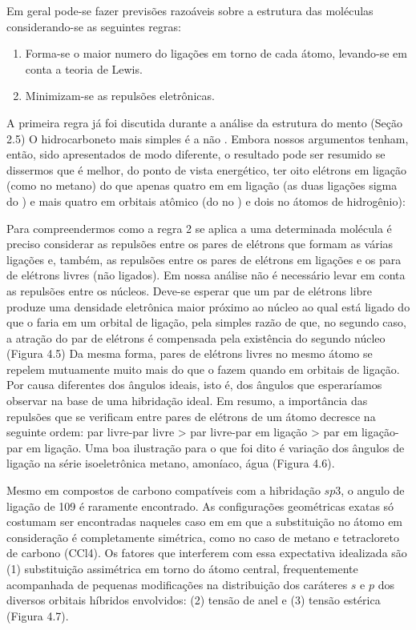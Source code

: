 Em geral pode-se fazer previsões razoáveis sobre a estrutura das moléculas considerando-se as seguintes regras:

\begin{enumerate}
    \item Forma-se o maior numero do ligações em torno de cada átomo, levando-se em conta a teoria de Lewis.
    \item Minimizam-se as repulsões eletrônicas.
\end{enumerate}

A primeira regra já foi discutida durante a análise da estrutura do mento (Seção 2.5) O hidrocarboneto mais simples é  a não . Embora nossos argumentos tenham, então, sido apresentados de modo diferente, o resultado pode ser resumido se dissermos que é melhor, do ponto de vista energético, ter oito elétrons em ligação (como no metano) do que apenas quatro em em ligação (as duas ligações sigma do ) e mais quatro em orbitais atômico (do no ) e dois no átomos de hidrogênio):

Para compreendermos como a regra 2 se aplica a uma determinada molécula é preciso considerar as repulsões entre os pares de elétrons que formam as várias ligações e, também, as repulsões entre os pares de elétrons em ligações e os para de elétrons livres (não ligados). Em nossa análise não é necessário levar em conta as repulsões entre os núcleos. Deve-se esperar que um par de elétrons libre produze uma densidade eletrônica maior próximo ao núcleo ao qual está ligado do que o faria em um orbital de ligação, pela simples razão de que, no segundo caso, a atração do par de elétrons é compensada pela existência do segundo núcleo (Figura 4.5) Da mesma forma, pares de elétrons livres no mesmo átomo se repelem mutuamente muito mais do que o fazem quando em orbitais de ligação. Por causa diferentes dos ângulos ideais, isto é, dos ângulos que esperaríamos observar na base de uma hibridação ideal. Em resumo, a importância das repulsões que se verificam entre pares de elétrons de um átomo decresce na seguinte ordem: par livre-par livre > par livre-par em ligação > par em ligação-par em ligação. Uma boa ilustração para o que foi dito é variação dos ângulos de ligação na série isoeletrônica metano, amoníaco, água (Figura 4.6).

Mesmo em compostos de carbono compatíveis com a hibridação $sp3$, o angulo de ligação de 109 é raramente encontrado. As configurações geométricas exatas só costumam ser encontradas naqueles caso em em que a substituição no átomo em consideração é completamente simétrica, como no caso de metano e tetracloreto de carbono (CCl4). Os fatores que interferem com essa expectativa idealizada são (1) substituição assimétrica em torno do átomo central, frequentemente acompanhada de pequenas modificações na distribuição dos caráteres $s$ e $p$ dos diversos orbitais híbridos envolvidos: (2) tensão de anel e (3) tensão estérica (Figura 4.7).

